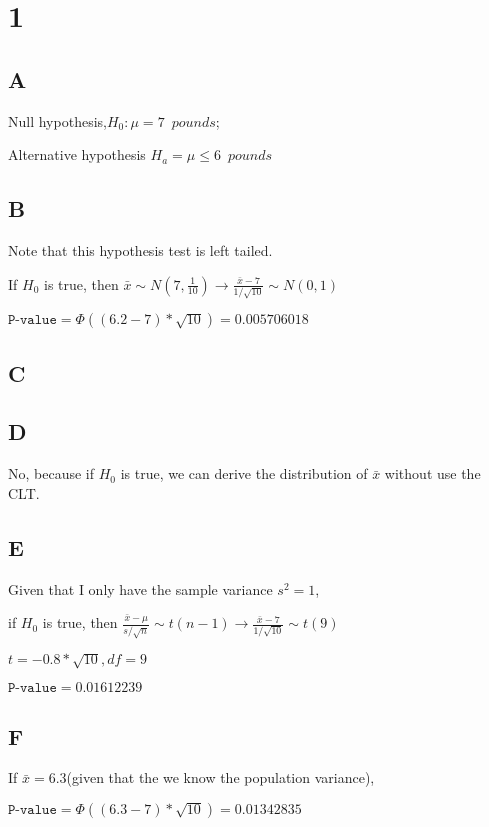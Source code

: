 \documentclass{article}
\begin{document}
\section*{1}
\subsection*{A}

Null hypothesis,$H_0: \mu=7\enspace pounds$;

\noindent Alternative hypothesis $H_a=\mu\le6\enspace pounds$


\subsection*{B}

Note that this hypothesis test is left tailed.

If $H_0$ is true, then $\bar{x}\sim N(7,\frac{1}{10})\rightarrow \frac{\bar{x}-7}{1/\sqrt{10}}\sim N(0,1)$

$\texttt{P-value}=\Phi((6.2-7)*\sqrt{10})= 0.005706018$

\subsection*{C}

\subsection*{D}
No, because if $H_0$ is true, we can derive the distribution of $\bar{x}$ without use the CLT.

\subsection*{E}
Given that I only have the sample variance $s^2=1$, 

if $H_0$ is true, then $\frac{\bar{x}-\mu}{s/\sqrt{n}}\sim t(n-1)\rightarrow \frac{\bar{x}-7}{1/\sqrt{10}}\sim t(9)$

$t=-0.8*\sqrt{10},df=9$

$\texttt{P-value}=0.01612239$ 

\subsection*{F}

If $\bar{x}=6.3$(given that the we know the population variance),

$\texttt{P-value}=\Phi((6.3-7)*\sqrt{10})=0.01342835$
\end{document}
